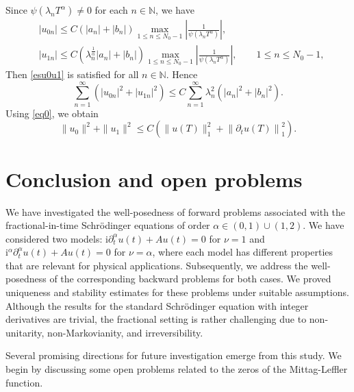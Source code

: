 \documentclass[reqno]{amsart}
\makeatletter
\renewenvironment{proof}[1][\proofname]{\par
  \pushQED{\qed}%
  \normalfont \topsep6\p@\@plus6\p@\relax
  \trivlist
  \item[\hskip\labelsep\bfseries #1\@addpunct{.}]%
}{%
  \popQED\endtrivlist\@endpefalse
}
\numberwithin{equation}{section}
\makeatother
\begin{document}
\begin{proof}
\begin{equation}
\end{equation}
Since $\psi\left(\lambda_n T^\alpha\right) \neq 0$ for each $n \in \mathbb{N}$, we have
$$
\begin{aligned}
& \left|u_{0n}\right| \leq C \left(\left|a_n\right|+\left|b_n\right|\right)\max_{1 \leq n \leq N_0-1}\left|\frac{1}{\psi\left(\lambda_n T^\alpha\right)}\right|, \\
& \left|u_{1n}\right| \leq C \left(\lambda_n^{\frac{1}{\alpha}}\left|a_n\right|+\left|b_n\right|\right)\max_{1 \leq n \leq N_0-1}\left|\frac{1}{\psi\left(\lambda_n T^\alpha\right)}\right|, \qquad 1 \leq n \leq N_0-1,
\end{aligned}
$$
Then \eqref{esu0u1} is satisfied for all $n \in \mathbb{N}$. Hence
$$
\sum_{n=1}^{\infty} \left(\left|u_{0n}\right|^2+\left|u_{1n}\right|^2\right) \leq C \sum_{n=1}^{\infty}  \lambda_n^2\left(\left|a_n\right|^2+\left|b_n\right|^2\right).
$$
Using \eqref{eq0}, we obtain
$$
\|u_0\|^2+\|u_1\|^2 \leq C \left(\|u(T)\|_{1}^2+\left\|\partial_t u(T)\right\|_{1}^2\right) .
$$
\end{proof}

\section{Conclusion and open problems}\label{sec5}
We have investigated the well-posedness of forward problems associated with the fractional-in-time Schrödinger equations of order $\alpha \in (0,1)\cup (1,2)$. We have considered two models: $\mathrm{i} \partial_t^\alpha u(t) + A u(t)=0$ for $\nu=1$ and $\mathrm{i}^\alpha \partial_t^\alpha u(t) + A u(t)=0$ for $\nu=\alpha$, where each model has different properties that are relevant for physical applications. Subsequently, we address the well-posedness of the corresponding backward problems for both cases. We proved uniqueness and stability estimates for these problems under suitable assumptions. Although the results for the standard Schrödinger equation with integer derivatives are trivial, the fractional setting is rather challenging due to non-unitarity, non-Markovianity, and irreversibility.

Several promising directions for future investigation emerge from this study. We begin by discussing some open problems related to the zeros of the Mittag-Leffler function.
\end{document}
